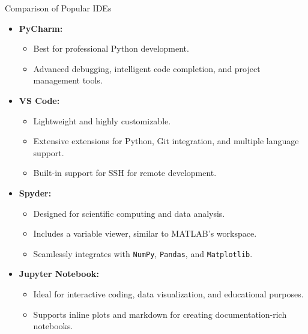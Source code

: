 \documentclass[10pt]{beamer}
\let\olditem\item
\renewcommand\item{\olditem\justifying}
\begin{document}
	\begin{frame}{Comparison of Popular IDEs}
		\begin{adjustbox}{scale=.9}
		\begin{minipage}{1.11\linewidth}
		\begin{itemize}	
			\item \textbf{PyCharm:}
			\hfill{}
			\begin{itemize}
				\item Best for professional Python development.
				\item Advanced debugging, intelligent code completion, and project management tools.
			\end{itemize}
			\item \textbf{VS Code:}
			\hfill{}
			\begin{itemize}
				\item Lightweight and highly customizable.
				\item Extensive extensions for Python, Git integration, and multiple language support.
				\item Built-in support for SSH for remote development.
			\end{itemize}
			\item \textbf{Spyder:}
			\hfill{}
			\begin{itemize}
				\item Designed for scientific computing and data analysis.
				\item Includes a variable viewer, similar to MATLAB's workspace.
				\item Seamlessly integrates with \texttt{NumPy}, \texttt{Pandas}, and \texttt{Matplotlib}.
			\end{itemize}
			\item \textbf{Jupyter Notebook:}
			\hfill{}
			\begin{itemize}
				\item Ideal for interactive coding, data visualization, and educational purposes.
				\item Supports inline plots and markdown for creating documentation-rich notebooks.
			\end{itemize}
		\end{itemize}
		\end{minipage}
		\end{adjustbox}
	\end{frame}
	
\end{document}
